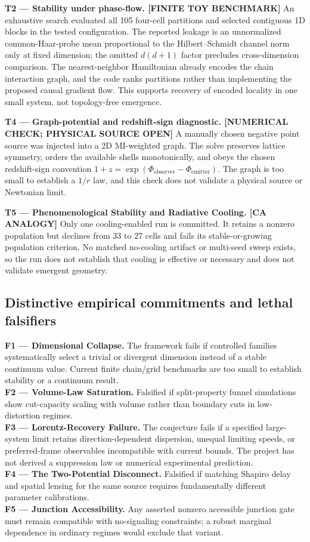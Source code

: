 \documentclass[reprint, amsmath, amssymb, aps, prd]{revtex4-2}
\begin{document}
\textbf{T2 --- Stability under phase-flow. [FINITE TOY BENCHMARK]}
An exhaustive search evaluated all 105 four-cell partitions and selected contiguous 1D blocks in the tested configuration. The reported leakage is an unnormalized common-Haar-probe mean proportional to the Hilbert--Schmidt channel norm only at fixed dimension; the omitted $d(d+1)$ factor precludes cross-dimension comparison. The nearest-neighbor Hamiltonian already encodes the chain interaction graph, and the code ranks partitions rather than implementing the proposed causal gradient flow. This supports recovery of encoded locality in one small system, not topology-free emergence.

\textbf{T4 --- Graph-potential and redshift-sign diagnostic. [NUMERICAL CHECK; PHYSICAL SOURCE OPEN]}
A manually chosen negative point source was injected into a 2D MI-weighted graph. The solve preserves lattice symmetry, orders the available shells monotonically, and obeys the chosen redshift-sign convention $1+z=\exp(\Phi_{\mathrm{observer}}-\Phi_{\mathrm{emitter}})$. The graph is too small to establish a $1/r$ law, and this check does not validate a physical source or Newtonian limit.

\textbf{T5 --- Phenomenological Stability and Radiative Cooling. [CA ANALOGY]}
Only one cooling-enabled run is committed. It retains a nonzero population but declines from 33 to 27 cells and fails its stable-or-growing population criterion. No matched no-cooling artifact or multi-seed sweep exists, so the run does not establish that cooling is effective or necessary and does not validate emergent geometry.

\subsection{Distinctive empirical commitments and lethal falsifiers}
\textbf{F1 --- Dimensional Collapse.} The framework fails if controlled families systematically select a trivial or divergent dimension instead of a stable continuum value. Current finite chain/grid benchmarks are too small to establish stability or a continuum result. \\
\textbf{F2 --- Volume-Law Saturation.} Falsified if split-property funnel simulations show cut-capacity scaling with volume rather than boundary cuts in low-distortion regimes. \\
\textbf{F3 --- Lorentz-Recovery Failure.} The conjecture fails if a specified large-system limit retains direction-dependent dispersion, unequal limiting speeds, or preferred-frame observables incompatible with current bounds. The project has not derived a suppression law or numerical experimental prediction. \\
\textbf{F4 --- The Two-Potential Disconnect.} Falsified if matching Shapiro delay and spatial lensing for the same source requires fundamentally different parameter calibrations. \\
\textbf{F5 --- Junction Accessibility.} Any asserted nonzero accessible junction gate must remain compatible with no-signaling constraints; a robust marginal dependence in ordinary regimes would exclude that variant.
\end{document}
